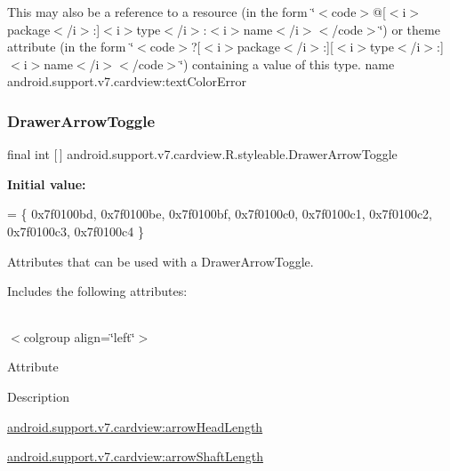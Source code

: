 This may also be a reference to a resource (in the form \char`\"{}$<$code$>$@\mbox{[}$<$i$>$package$<$/i$>$\+:\mbox{]}$<$i$>$type$<$/i$>$\+:$<$i$>$name$<$/i$>$$<$/code$>$\char`\"{}) or theme attribute (in the form \char`\"{}$<$code$>$?\mbox{[}$<$i$>$package$<$/i$>$\+:\mbox{]}\mbox{[}$<$i$>$type$<$/i$>$\+:\mbox{]}$<$i$>$name$<$/i$>$$<$/code$>$\char`\"{}) containing a value of this type.  name android.\+support.\+v7.\+cardview\+:text\+Color\+Error \mbox{\label{classandroid_1_1support_1_1v7_1_1cardview_1_1R_1_1styleable_a159ca17c520d2f2d93f6152d01b0b8df}} 
\subsubsection{\texorpdfstring{Drawer\+Arrow\+Toggle}{DrawerArrowToggle}}
{\footnotesize\ttfamily final int \mbox{[}$\,$\mbox{]} android.\+support.\+v7.\+cardview.\+R.\+styleable.\+Drawer\+Arrow\+Toggle\hspace{0.3cm}{\ttfamily [static]}}

{\bfseries Initial value\+:}
\begin{DoxyCode}
= \{
            0x7f0100bd, 0x7f0100be, 0x7f0100bf, 0x7f0100c0,
            0x7f0100c1, 0x7f0100c2, 0x7f0100c3, 0x7f0100c4
        \}
\end{DoxyCode}
Attributes that can be used with a Drawer\+Arrow\+Toggle. 

Includes the following attributes\+:

\tabulinesep=1mm
\begin{longtabu} spread 0pt [c]{*{0}{|X[-1]}|}
\hline
\end{longtabu}
$<$colgroup align=\char`\"{}left\char`\"{}$>$ 

Attribute

Description 

{\ttfamily \hyperlink{classandroid_1_1support_1_1v7_1_1cardview_1_1R_1_1styleable_a8c10e1947477e23e8e39b04ea7b31d6d}{android.\+support.\+v7.\+cardview\+:arrow\+Head\+Length}}

{\ttfamily \hyperlink{classandroid_1_1support_1_1v7_1_1cardview_1_1R_1_1styleable_aba47177953e487458623d40854700ad5}{android.\+support.\+v7.\+cardview\+:arrow\+Shaft\+Length}}

